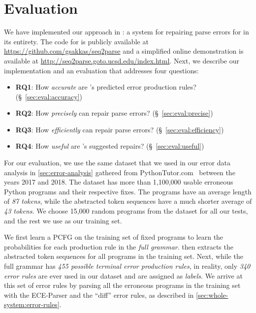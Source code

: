 \section{Evaluation}
\label{sec:eval}

We have implemented our approach in \toolname: a system for repairing parse
errors for \python in its entirety. The code for \toolname is publicly available
at \url{https://github.com/gsakkas/seq2parse} and a simplified online
demonstration is available at \url{http://seq2parse.goto.ucsd.edu/index.html}.
Next, we describe our implementation and an evaluation that addresses four
questions:

\begin{itemize}
    \item \textbf{RQ1}: How \emph{accurate} are \toolname's predicted error production rules?
                        (\S~\ref{sec:eval:accuracy})
    \item \textbf{RQ2}: How \emph{precisely} can \toolname repair parse errors?
                        (\S~\ref{sec:eval:precise})
    \item \textbf{RQ3}: How \emph{efficiently} can \toolname repair parse errors?
                        (\S~\ref{sec:eval:efficiency})
    \item \textbf{RQ4}: How \emph{useful} are \toolname's suggested repairs?
                        (\S~\ref{sec:eval:useful})
\end{itemize}


For our evaluation, we use the same \python dataset that we used in our error
data analysis in \autoref{sec:error-analysis} gathered from
PythonTutor.com~\citep{Guo2013} between the years 2017 and 2018. The dataset has
more than 1,100,000 usable erroneous Python programs and their respective fixes.
The programs have an average length of \emph{87 tokens}, while the abstracted
token sequences have a much shorter average of \emph{43 tokens}. We choose
15,000 random programs from the dataset for all our tests, and the rest we use
as our training set.

We first learn a PCFG on the training set of fixed programs to learn the
probabilities for each production rule in the \emph{full \python grammar}.
\toolname then extracts the abstracted token sequences for all programs in the
training set. Next, while the full \python grammar has \emph{455 possible
terminal error production rules}, in reality, only \emph{340 error rules} are
ever used in our dataset and are assigned as \emph{labels}. We arrive at this
set of error rules by parsing all the erroneous programs in the training set
with the ECE-Parser and the ``diff'' error rules, as described in
\autoref{sec:whole-system:error-rules}.

